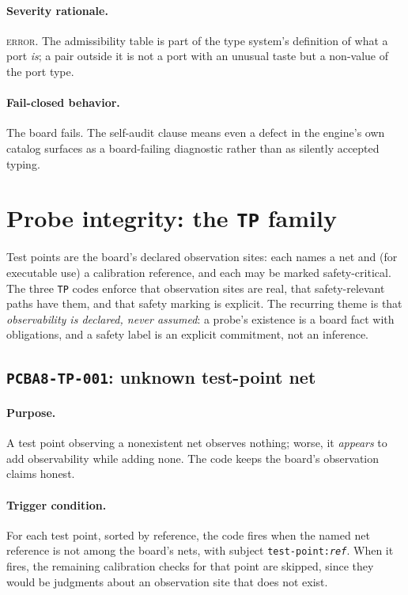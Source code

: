 \paragraph{Severity rationale.} \textsc{error}. The admissibility table is part of the type system's definition of what a port \emph{is}; a pair outside it is not a port with an unusual taste but a non-value of the port type.

\paragraph{Fail-closed behavior.} The board fails. The self-audit clause means even a defect in the engine's own catalog surfaces as a board-failing diagnostic rather than as silently accepted typing.

\section{Probe integrity: the \texttt{TP} family}\label{ch07:sec:tp}

Test points are the board's declared observation sites: each names a net and (for executable use) a calibration reference, and each may be marked safety-critical. The three \texttt{TP} codes enforce that observation sites are real, that safety-relevant paths have them, and that safety marking is explicit. The recurring theme is that \emph{observability is declared, never assumed}: a probe's existence is a board fact with obligations, and a safety label is an explicit commitment, not an inference.

\subsection{\texttt{PCBA8-TP-001}: unknown test-point net}\label{ch07:sub:tp001}

\paragraph{Purpose.} A test point observing a nonexistent net observes nothing; worse, it \emph{appears} to add observability while adding none. The code keeps the board's observation claims honest.

\paragraph{Trigger condition.} For each test point, sorted by reference, the code fires when the named net reference is not among the board's nets, with subject \texttt{test-point:\emph{ref}}. When it fires, the remaining calibration checks for that point are skipped, since they would be judgments about an observation site that does not exist.

